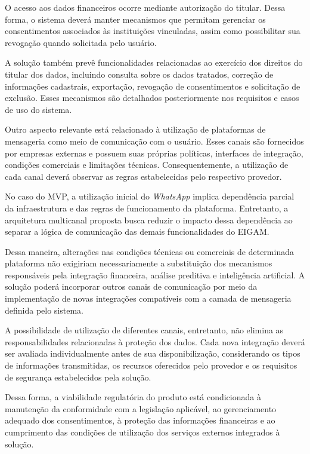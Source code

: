 O acesso aos dados financeiros ocorre mediante autorização do titular. Dessa forma, o sistema deverá manter mecanismos que permitam gerenciar os consentimentos associados às instituições vinculadas, assim como possibilitar sua revogação quando solicitada pelo usuário.

A solução também prevê funcionalidades relacionadas ao exercício dos direitos do titular dos dados, incluindo consulta sobre os dados tratados, correção de informações cadastrais, exportação, revogação de consentimentos e solicitação de exclusão. Esses mecanismos são detalhados posteriormente nos requisitos e casos de uso do sistema.

Outro aspecto relevante está relacionado à utilização de plataformas de mensageria como meio de comunicação com o usuário. Esses canais são fornecidos por empresas externas e possuem suas próprias políticas, interfaces de integração, condições comerciais e limitações técnicas. Consequentemente, a utilização de cada canal deverá observar as regras estabelecidas pelo respectivo provedor.

No caso do MVP, a utilização inicial do \textit{WhatsApp} implica dependência parcial da infraestrutura e das regras de funcionamento da plataforma. Entretanto, a arquitetura multicanal proposta busca reduzir o impacto dessa dependência ao separar a lógica de comunicação das demais funcionalidades do EIGAM.

Dessa maneira, alterações nas condições técnicas ou comerciais de determinada plataforma não exigiriam necessariamente a substituição dos mecanismos responsáveis pela integração financeira, análise preditiva e inteligência artificial. A solução poderá incorporar outros canais de comunicação por meio da implementação de novas integrações compatíveis com a camada de mensageria definida pelo sistema.

A possibilidade de utilização de diferentes canais, entretanto, não elimina as responsabilidades relacionadas à proteção dos dados. Cada nova integração deverá ser avaliada individualmente antes de sua disponibilização, considerando os tipos de informações transmitidas, os recursos oferecidos pelo provedor e os requisitos de segurança estabelecidos pela solução.

Dessa forma, a viabilidade regulatória do produto está condicionada à manutenção da conformidade com a legislação aplicável, ao gerenciamento adequado dos consentimentos, à proteção das informações financeiras e ao cumprimento das condições de utilização dos serviços externos integrados à solução.


